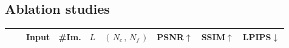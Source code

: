 \documentclass[runningheads]{llncs}
\newcommand{\numsamplescoarse}{N_c}
\newcommand{\numsamplesfine}{N_f}
\newcommand{\posxyz}{xyz}
\newcommand{\angletheta}{\theta}
\newcommand{\anglephi}{\phi}
\newcommand{\posall}{\posxyz\angletheta\anglephi}
\newcommand{\numfrequencies}{L}
\begin{document}
\subsection{Ablation studies}
\label{sec:ablations}



\setlength{\tabcolsep}{4pt}
\begin{table}[t]
\centering
\begin{tabular}{@{\,}l@{\,\,}l|cccc|ccc@{\,}}
& & Input & \#Im. & $\numfrequencies$ & $(\,\numsamplescoarse\,, \,\numsamplesfine\,)$ &  PSNR$\uparrow$ & SSIM$\uparrow$ & LPIPS$\downarrow$  \\
\hline

\end{tabular}
\end{table}
\end{document}
